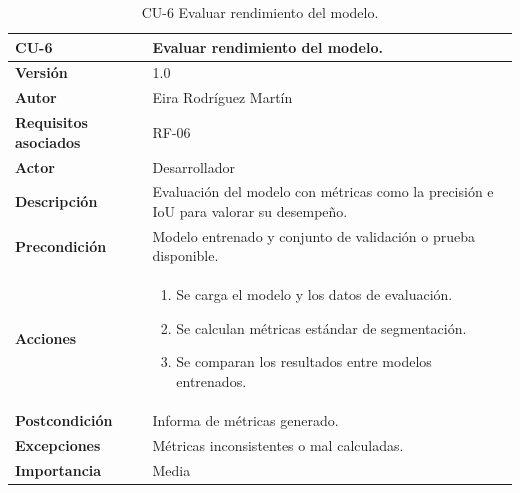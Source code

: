 \begin{table}[!h]
	\centering
	\begin{tabularx}{\linewidth}{ p{} p{} }
		\toprule
		\textbf{CU-6}    & \textbf{Evaluar rendimiento del modelo.}\\
		\toprule
		\textbf{Versión}              & 1.0    \\
		\textbf{Autor}                & Eira Rodríguez Martín \\
		\textbf{Requisitos asociados} & RF-06 \\
        \textbf{Actor}                & Desarrollador \\
		\textbf{Descripción}          & Evaluación del modelo con métricas como la precisión e IoU para valorar su desempeño.\\
		\textbf{Precondición}         & Modelo entrenado y conjunto de validación o prueba disponible. \\
		\textbf{Acciones}             &
		\begin{enumerate}
			\def\labelenumi{\arabic{enumi}.}
			\tightlist
			\item Se carga el modelo y los datos de evaluación.
			\item Se calculan métricas estándar de segmentación.
            \item Se comparan los resultados entre modelos entrenados.
		\end{enumerate}\\
		\textbf{Postcondición}        & Informa de métricas generado. \\
		\textbf{Excepciones}          & Métricas inconsistentes o mal calculadas. \\
		\textbf{Importancia}          & Media \\
		\bottomrule
	\end{tabularx}
	\caption{CU-6 Evaluar rendimiento del modelo.}
\end{table}




